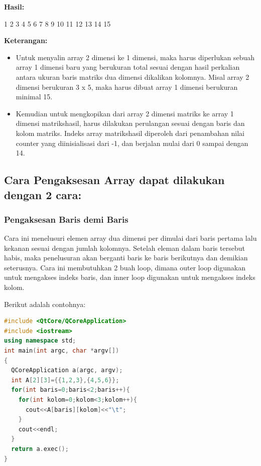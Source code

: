 \textbf{Hasil:}

\begin{lcverbatim}
1
2
3
4
5
6
7
8
9
10
11
12
13
14
15
\end{lcverbatim}

\textbf{Keterangan:}

\begin{itemize}

\item
  Untuk menyalin array 2 dimensi ke 1 dimensi, maka harus diperlukan
  sebuah array 1 dimensi baru yang berukuran total sesuai dengan hasil
  perkalian antara ukuran baris matriks dua dimensi dikalikan kolomnya.
  Misal array 2 dimensi berukuran 3 x 5, maka harus dibuat array 1
  dimensi berukuran minimal 15.
\item
  Kemudian untuk mengkopikan dari array 2 dimensi matriks ke array 1
  dimensi matrikshasil, harus dilakukan perulangan sesuai dengan baris
  dan kolom matriks. Indeks array matrikshasil diperoleh dari penambahan
  nilai counter yang diinisialisasi dari -1, dan berjalan mulai dari 0
  sampai dengan 14.
\end{itemize}

\subsection{Cara Pengaksesan Array dapat dilakukan dengan 2
cara:}\label{cara-pengaksesan-array-dapat-dilakukan-dengan-2-cara}

\subsubsection{Pengaksesan Baris demi Baris}\label{pengaksesan-baris-demi-baris}

Cara ini menelusuri elemen array dua dimensi per dimulai dari baris
pertama lalu kekanan sesuai dengan jumlah kolomnya. Setelah eleman dalam
baris tersebut habis, maka penelusuran akan berganti baris ke baris
berikutnya dan demikian seterusnya. Cara ini membutuhkan 2 buah loop,
dimana outer loop digunakan untuk mengakses indeks baris, dan inner loop
digunakan untuk mengakses indeks kolom.

Berikut adalah contohnya:

\begin{lstlisting}[language=c++, caption=Pengaksesan Baris demi Baris, label=contoh3-12]
#include <QtCore/QCoreApplication>
#include <iostream>
using namespace std;
int main(int argc, char *argv[])
{
  QCoreApplication a(argc, argv);
  int A[2][3]={{1,2,3},{4,5,6}};
  for(int baris=0;baris<2;baris++){
    for(int kolom=0;kolom<3;kolom++){
      cout<<A[baris][kolom]<<"\t";
    }
    cout<<endl;
  }
  return a.exec();
}
\end{lstlisting}

